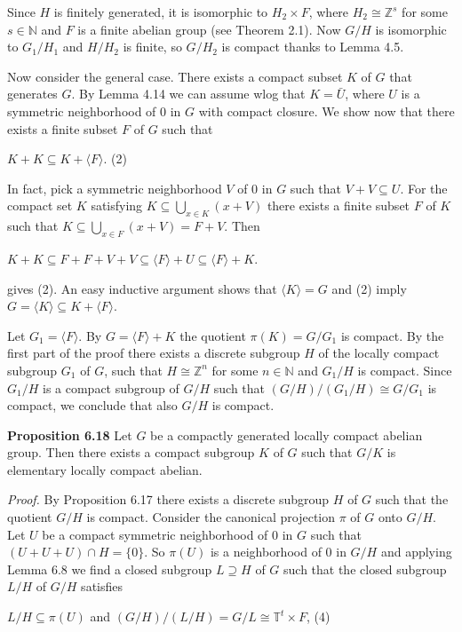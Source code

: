 \documentclass[12pt]{article}
\begin{document}
\begin{itemize}
\begin{itemize}
    Since $H$ is finitely generated, it is isomorphic to $H_2 \times F$, where $H_2 \cong \mathbb{Z}^s$ for some $s \in \mathbb{N}$ and $F$ is a finite
abelian group (see Theorem 2.1). Now $G/H$ is isomorphic to $G_1/H_1$ and $H/H_2$ is finite, so $G/H_2$ is compact
thanks to Lemma 4.5.


    Now consider the general case. There exists a compact subset $K$ of $G$ that generates $G$. By Lemma 4.14 we
can assume wlog that $K = \bar{U}$, where $U$ is a symmetric neighborhood of 0 in $G$ with compact closure. We show
now that there exists a finite subset $F$ of $G$ such that


    $K + K \subseteq K + \langle F \rangle$. (2)


In fact, pick a symmetric neighborhood $V$ of 0 in $G$ such that $V + V \subseteq U$. For the compact set $K$ satisfying
$K \subseteq \bigcup_{x \in K}(x + V )$ there exists a finite subset $F$ of $K$ such that $K \subseteq \bigcup_{x \in F}(x + V) = F + V$. Then


    $K + K \subseteq F + F + V + V \subseteq \langle F \rangle + U ⊆ \langle F \rangle + K$.


gives (2). An easy inductive argument shows that $\langle K \rangle = G$ and (2) imply $G = \langle K \rangle \subseteq K + \langle F \rangle $.


    Let $G_1 = \langle F \rangle$. By $G = \langle F \rangle + K$ the quotient $\pi(K) = G/G_1$ is compact. By the first part of the proof there
exists a discrete subgroup $H$ of the locally compact subgroup $G_1$ of $G$, such that $H \cong \mathbb{Z}^n$ for some $n \in \mathbb{N}$ and
$G_1/H$ is compact. Since $G_1/H$ is a compact subgroup of $G/H$ such that $(G/H)/(G_1/H) \cong G/G_1$ is compact,
we conclude that also $G/H$ is compact.


\textbf{Proposition 6.18} Let $G$ be a compactly generated locally compact abelian group. Then there exists a compact
subgroup $K$ of $G$ such that $G/K$ is elementary locally compact abelian.


    \emph{Proof.} By Proposition 6.17 there exists a discrete subgroup $H$ of $G$ such that the quotient $G/H$ is compact.
Consider the canonical projection $\pi$ of $G$ onto $G/H$. Let $U$ be a compact symmetric neighborhood of 0 in $G$
such that $(U + U + U) \cap H = \{0\}$. So $\pi(U)$ is a neighborhood of 0 in $G/H$ and applying Lemma 6.8 we find a
closed subgroup $L \supseteq H$ of $G$ such that the closed subgroup $L/H$ of $G/H$ satisfies


    $L/H \subseteq \pi(U)$ and $(G/H)/(L/H) = G/L \cong \mathbb{T}^t \times F$, (4)



\end{itemize}
\end{itemize}
\end{document}
